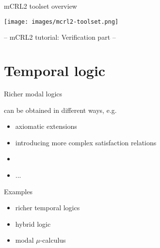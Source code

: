 \documentclass{beamer}
\begin{document}
\begin{slide}{mCRL2 toolset overview}
  \centering
  
  \texttt{[image: images/mcrl2-toolset.png]}

  -- mCRL2 tutorial: Verification part --
\end{slide}



 \section{Temporal logic}


\begin{slide}{Richer modal logics}\label{s:40}
\small

can be obtained in different ways, e.g.

\begin{itemize}
\item axiomatic extensions
\item introducing more complex satisfaction relations
\item {}
\item ...
\end{itemize}
 
 Examples
 \begin{itemize}
 \item richer temporal logics
\item hybrid logic
 \item modal $\mu$-calculus 
\end{itemize}
\end{slide}
\end{document}

